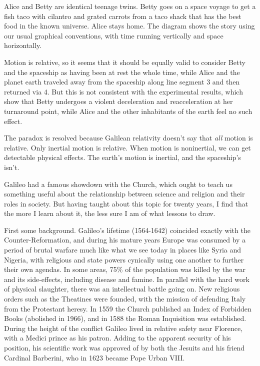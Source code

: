 Alice and Betty are identical teenage twins. Betty goes on a space voyage to get a fish taco with
cilantro and grated carrots from a
taco shack that has the best food in the known universe. Alice stays home. The diagram shows the story using our usual
graphical conventions, with time running vertically and space horizontally.

\begin{figure}[h]\label{fig:galilean-twin-paradox}
\end{figure}

Motion is relative, so it seems that it should be equally valid to consider Betty
and the spaceship as having been at rest the whole time, while
Alice and the planet earth traveled away from the spaceship along
line segment 3 and then returned via 4. But this is not consistent with the
experimental results, which show that Betty undergoes a violent
deceleration and reacceleration at her turnaround point, while Alice and the other
inhabitants of the earth feel no such effect.

The paradox is resolved because Galilean relativity doesn't say that \emph{all}
motion is relative. Only inertial motion is relative. When motion is noninertial, we can get detectable
physical effects. The earth's motion is inertial, and the spaceship's isn't.

\pagebreak


Galileo had a famous showdown with the Church, which ought to teach us something useful about
the relationship between science and religion and their roles in society. But having taught
about this topic for twenty years, I find that the more I learn about it, the less sure I am
of what lessons to draw.

First some background. Galileo's lifetime (1564-1642) coincided exactly
with the Counter-Reformation, and during his mature years Europe was consumed by a period
of brutal warfare much like what we see today in places like Syria and Nigeria, with religious and state
powers cynically using one another to further their own agendas. In some areas, 75\% of
the population was killed by the war and its side-effects, including disease and famine.
In parallel with the hard work of physical slaughter, there was an intellectual battle going on.
New religious orders such as the Theatines were founded, with the mission of defending Italy from
the Protestant heresy. In 1559 the Church published an
Index of Forbidden Books (abolished in 1966), and in 1588 the Roman Inquisition was established.
During the height of the conflict Galileo lived in relative safety near Florence, with a Medici prince as his patron.
Adding to the apparent security of his position, his scientific work was approved of by both
the Jesuits and his friend Cardinal Barberini, who in 1623 became Pope Urban VIII.

